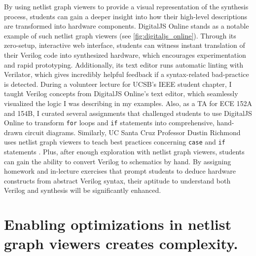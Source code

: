 By using netlist graph viewers to provide a visual representation of the synthesis process, students can gain a deeper insight into how their high-level descriptions are transformed into hardware components. DigitalJS Online \cite{DigitalJSOnline} stands as a notable example of such netlist graph viewers (see \autoref{fig:digitaljs_online}). Through its zero-setup, interactive web interface, students can witness instant translation of their Verilog code into synthesized hardware, which encourages experimentation and rapid prototyping. Additionally, its text editor runs automatic linting with Verilator, which gives incredibly helpful feedback if a syntax-related bad-practice is detected. During a volunteer lecture for UCSB's IEEE student chapter, I taught Verilog concepts from DigitalJS Online's text editor, which seamlessly visualized the logic I was describing in my examples. Also, as a TA for ECE 152A and 154B, I curated several assignments that challenged students to use DigitalJS Online to transform \texttt{for} loops and \texttt{if} statements into comprehensive, hand-drawn circuit diagrams. Similarly, UC Santa Cruz Professor Dustin Richmond uses netlist graph viewers to teach best practices concerning \texttt{case} and \texttt{if} statements \cite{RichmondLatchUp}. Plus, after enough exploration with netlist graph viewers, students can gain the ability to convert Verilog to schematics by hand. By assigning homework and in-lecture exercises that prompt students to deduce hardware constructs from abstract Verilog syntax, their aptitude to understand both Verilog and synthesis will be significantly enhanced.

\FloatBarrier

\section{Enabling optimizations in netlist graph viewers creates complexity.}
\label{section:optimizations_in_netlist_graph_viewers}



